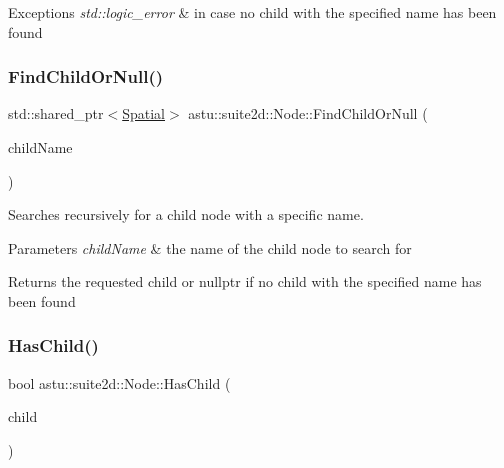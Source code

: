 \begin{DoxyExceptions}{Exceptions}
{\em std\+::logic\+\_\+error} & in case no child with the specified name has been found \\
\hline
\end{DoxyExceptions}
\mbox{\label{classastu_1_1suite2d_1_1Node_a91a2cf94366c6477e7a16aba676155c3}} 
\subsubsection{\texorpdfstring{Find\+Child\+Or\+Null()}{FindChildOrNull()}}
{\footnotesize\ttfamily std\+::shared\+\_\+ptr$<$\hyperlink{classastu_1_1suite2d_1_1Spatial}{Spatial}$>$ astu\+::suite2d\+::\+Node\+::\+Find\+Child\+Or\+Null (\begin{DoxyParamCaption}\item[{const std\+::string \&}]{child\+Name }\end{DoxyParamCaption})}

Searches recursively for a child node with a specific name.


\begin{DoxyParams}{Parameters}
{\em child\+Name} & the name of the child node to search for \\
\hline
\end{DoxyParams}
\begin{DoxyReturn}{Returns}
the requested child or {\ttfamily nullptr} if no child with the specified name has been found 
\end{DoxyReturn}
\mbox{\label{classastu_1_1suite2d_1_1Node_aed39b6e4e99794a8d50d66338f34fb0f}} 
\subsubsection{\texorpdfstring{Has\+Child()}{HasChild()}}
{\footnotesize\ttfamily bool astu\+::suite2d\+::\+Node\+::\+Has\+Child (\begin{DoxyParamCaption}\item[{std\+::shared\+\_\+ptr$<$ \hyperlink{classastu_1_1suite2d_1_1Spatial}{Spatial} $>$}]{child }\end{DoxyParamCaption})}

